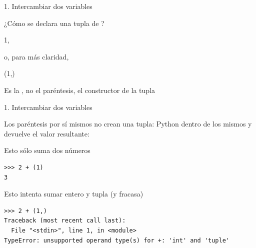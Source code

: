 \documentclass[14pt]{beamer}
\begin{document}
\begin{frame}{1. Intercambiar dos variables}
  \begin{center}
    ¿Cómo se declara una tupla de ?
  \end{center}

  \begin{block}{}
    \centering \huge 1,
  \end{block}

  o, para más claridad,

  \begin{block}{}
    \centering \huge (1,)
  \end{block}

  \begin{alertblock}{}
    \centering Es la , no el paréntesis, el
    constructor de la tupla
  \end{alertblock}
\end{frame}

\begin{frame}[fragile]{1. Intercambiar dos variables}

  \small
  \begin{block}{}
    \centering Los paréntesis por sí mismos no crean una tupla: Python
     dentro de los mismos y devuelve el
    valor resultante:
  \end{block}

  \small
  \begin{exampleblock}{Esto sólo suma dos números}
    \begin{lstlisting}
>>> 2 + (1)
3
    \end{lstlisting}
  \end{exampleblock}

  \begin{exampleblock}{Esto intenta sumar entero y tupla (y fracasa)} \scriptsize
    \begin{lstlisting}
>>> 2 + (1,)
Traceback (most recent call last):
  File "<stdin>", line 1, in <module>
TypeError: unsupported operand type(s) for +: 'int' and 'tuple'
    \end{lstlisting}
  \end{exampleblock}
\end{frame}
\end{document}
